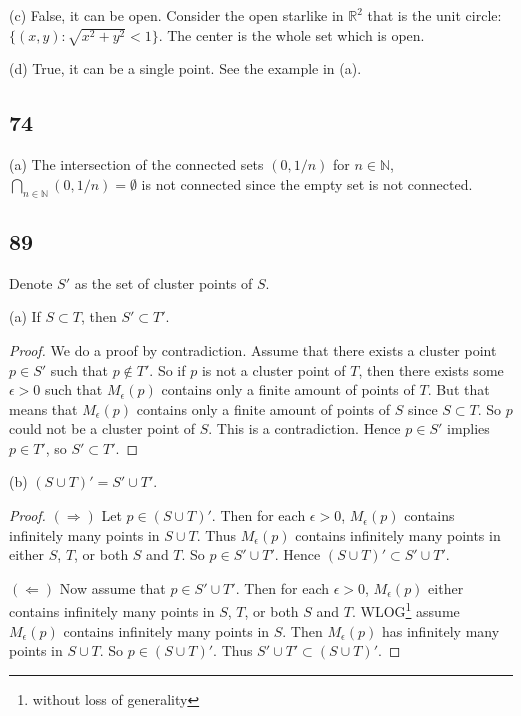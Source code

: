 \documentclass[11pt]{amsart}
\begin{document}
(c) False, it can be open. Consider the open starlike in $\mathbb{R}^{2}$ that is the unit circle: $\{(x,y):\sqrt{x^{2} + y^{2}} < 1\}$. The center is the whole set which is open.

(d) True, it can be a single point. See the example in (a).

\subsection*{74} (a) The intersection of the connected sets $(0,1/n)$ for $ n\in\mathbb{N}$, $\bigcap_{n\in\mathbb{N}}(0,1/n) = \emptyset$ is not connected since the empty set is not connected.


\subsection*{89} Denote $S'$ as the set of cluster points of $S$. 

(a) If $S\subset T$, then $S' \subset T'$.

\begin{proof}
  We do a proof by contradiction. Assume that there exists a cluster point $p\in S'$ such that $p\notin T'$. So if $p$ is not a cluster point of $T$, then there exists some $\epsilon > 0$ such that $M_{\epsilon}(p)$ contains only a finite amount of points of $T$. But that means that $M_{\epsilon}(p)$ contains only a finite amount of points of $S$ since $S \subset T$. So $p$ could not be a cluster point of $S$. This is a contradiction. Hence $p\in S'$ implies $p\in T'$, so $S' \subset T'$.
\end{proof}

(b) $(S\cup T)' = S' \cup T'$.

\begin{proof}
  $(\Rightarrow)$ Let $p\in (S\cup T)'$. Then for each $\epsilon > 0$, $M_{\epsilon}(p)$ contains infinitely many points in $S\cup T$. Thus $M_{\epsilon}(p)$ contains infinitely many points in either $S$, $T$, or both $S$ and $T$. So $p\in S' \cup T'$. Hence $(S\cup T)' \subset S' \cup T'$.

  $(\Leftarrow)$ Now assume that $p\in S' \cup T'$. Then for each $\epsilon > 0$, $M_{\epsilon}(p)$ either contains infinitely many points in $S$, $T$, or both $S$ and $T$. WLOG\footnote{without loss of generality} assume $M_{\epsilon}(p)$ contains infinitely many points in $S$. Then $M_{\epsilon}(p)$ has infinitely many points in $S\cup T$. So $p\in (S\cup T)'$. Thus $S'\cup T' \subset (S\cup T)'$.
\end{proof}
\end{document}
